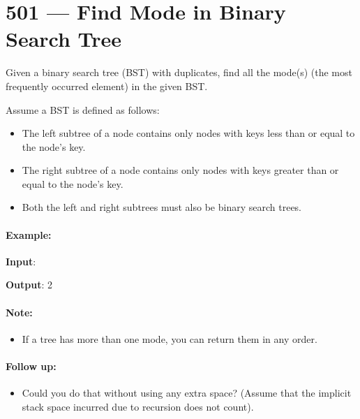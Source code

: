 \section{501 --- Find Mode in Binary Search Tree}
Given a binary search tree (BST) with duplicates, find all the mode(s) (the most frequently occurred element) in the given BST.

Assume a BST is defined as follows:

\begin{itemize}
\item The left subtree of a node contains only nodes with keys less than or equal to the node's key.
\item The right subtree of a node contains only nodes with keys greater than or equal to the node's key.
\item Both the left and right subtrees must also be binary search trees.
\end{itemize}
 
\paragraph{Example:}

\begin{flushleft}
\textbf{Input}:
\begin{figure}[H]
\end{figure}
\textbf{Output}: 2
\end{flushleft}

\paragraph{Note:} 

\begin{itemize}
\item If a tree has more than one mode, you can return them in any order.
\end{itemize}

\paragraph{Follow up:} 
\begin{itemize}
\item Could you do that without using any extra space? (Assume that the implicit stack space incurred due to recursion does not count).
\end{itemize}

